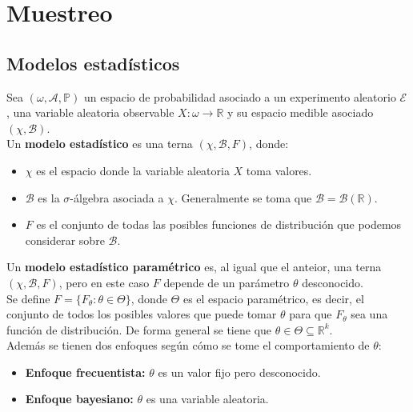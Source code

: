 
\section{Muestreo}

\subsection{Modelos estadísticos}

\label{Modelo estidístico}
\begin{definición}
Sea $(\omega, \mathcal{A}, \mathbb{P})$ un espacio de probabilidad asociado a un experimento aleatorio $\mathcal{E}$, una variable aleatoria observable $X: \omega \to \mathbb{R}$ y su espacio medible asociado $(\chi, \mathcal{B})$.
\\Un \textbf{modelo estadístico} es una terna $(\chi, \mathcal{B}, F)$, donde:
\vspace{-\topsep}
\begin{itemize}
	\item $\chi$ es el espacio donde la variable aleatoria $X$ toma valores.
	\item $\mathcal{B}$ es la $\sigma$-álgebra asociada a $\chi$. Generalmente se toma que $\mathcal{B} = \mathcal{B}(\mathbb{R})$.
	\item $F$ es el conjunto de todas las posibles funciones de distribución que podemos considerar sobre $\mathcal{B}$.
\end{itemize}
\end{definición}

\begin{definición}
Un \textbf{modelo estadístico paramétrico} es, al igual que el anteior, una terna $(\chi, \mathcal{B}, F)$, pero en este caso $F$ depende de un parámetro $\theta$ desconocido. \\
Se define $F = \{F_{\theta} : \theta \in \Theta\}$, donde $\Theta$ es el espacio paramétrico, es decir, el conjunto de todos los posibles valores que puede tomar $\theta$ para que $F_\theta$ sea una función de distribución.
De forma general se tiene que $\theta \in \Theta \subseteq \mathbb{R}^{k}$. \\
Además se tienen dos enfoques según cómo se tome el comportamiento de $\theta$:
\vspace{-\topsep}
\begin{itemize}
	\item \textbf{Enfoque frecuentista:} $\theta$ es un valor fijo pero desconocido.
	\item \textbf{Enfoque bayesiano:} $\theta$ es una variable aleatoria.
\end{itemize}
\end{definición}

